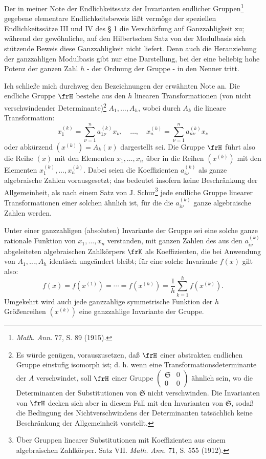 \documentclass[11pt]{article}
\providecommand{\frS}{\mathfrak S}
\begin{document}
Der in meiner Note \glqq der Endlichkeitssatz der Invarianten endlicher Gruppen\grqq{}\footnote{\emph{Math. Ann.} 77, S. 89 (1915).} gegebene elementare Endlichkeitsbeweis läßt vermöge der speziellen Endlichkeitssätze III und IV des § 1 die Verschärfung auf Ganzzahligkeit zu; während der gewöhnliche, auf den Hilbertschen Satz von der Modulbasis sich stützende Beweis diese Ganzzahligkeit nicht liefert. Denn auch die Heranziehung der ganzzahligen Modulbasis gibt nur eine Darstellung, bei der eine beliebig hohe Potenz der ganzen Zahl \(h\) - der Ordnung der Gruppe - in den Nenner tritt.

Ich schließe mich durchweg den Bezeichnungen der erwähnten Note an. Die endliche Gruppe \(\frH\) bestehe aus den \(h\) linearen Transformationen (von nicht verschwindender Determinante)\footnote{Es würde genügen, vorauszusetzen, daß \(\frH\) einer abstrakten endlichen Gruppe einstufig isomorph ist; d. h. wenn eine Transformationsdeterminante der \(A\) verschwindet, soll \(\frH\) einer Gruppe \(\begin{pmatrix}\frS&0\\0&0\end{pmatrix}\) ähnlich sein, wo die Determinanten der Substitutionen von \(\frS\) nicht verschwinden. Die Invarianten von \(\frH\) decken sich aber in diesem Fall mit den Invarianten von \(\frS\), sodaß die Bedingung des Nichtverschwindens der Determinanten tatsächlich keine Beschränkung der Allgemeinheit vorstellt.} \(A_1,\ldots,A_h\), wobei durch \(A_k\) die lineare Transformation:
\[
        x_1^{(k)}=\sum_{\nu=1}^{n}a_{1\nu}^{(k)}x_\nu,
        \quad\ldots,\quad
        x_n^{(k)}=\sum_{\nu=1}^{n}a_{n\nu}^{(k)}x_\nu
\]
oder abkürzend \((x^{(k)})=A_k(x)\) dargestellt sei. Die Gruppe \(\frH\) führt also die Reihe \((x)\) mit den Elementen \(x_1,\ldots,x_n\) über in die Reihen \((x^{(k)})\) mit den Elementen \(x_1^{(k)},\ldots,x_n^{(k)}\). Dabei seien die Koeffizienten \(a_{i\nu}^{(k)}\) als ganze algebraische Zahlen vorausgesetzt; das bedeutet insofern keine Beschränkung der Allgemeinheit, als nach einem Satz von J. Schur\footnote{Über Gruppen linearer Substitutionen mit Koeffizienten aus einem algebraischen Zahlkörper. Satz VII. \emph{Math. Ann.} 71, S. 555 (1912).} jede endliche Gruppe linearer Transformationen einer solchen ähnlich ist, für die die \(a_{i\nu}^{(k)}\) ganze algebraische Zahlen werden.

Unter einer ganzzahligen (absoluten) Invariante der Gruppe sei eine solche ganze rationale Funktion von \(x_1,\ldots,x_n\) verstanden, mit ganzen Zahlen des aus den \(a_{i\nu}^{(k)}\) abgeleiteten algebraischen Zahlkörpers \(\frK\) als Koeffizienten, die bei Anwendung von \(A_1,\ldots,A_h\) identisch ungeändert bleibt; für eine solche Invariante \(f(x)\) gilt also:
\begin{equation}
        f(x)=f(x^{(1)})=\cdots=f(x^{(h)})
        =\frac1h\sum_{k=1}^{h}f(x^{(k)}).
\end{equation}
Umgekehrt wird auch jede ganzzahlige symmetrische Funktion der \(h\) Größenreihen \((x^{(k)})\) eine ganzzahlige Invariante der Gruppe.
\end{document}
